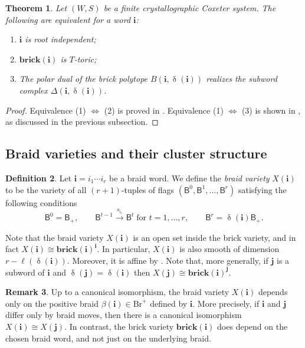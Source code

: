 \documentclass[a4paper, 11pt]{amsart}
\newcommand{\brick}{\mathbf{brick}}
\newcommand{\Br}{\mathrm{Br}}
\newcommand{\borel}{\mathsf{B}}
\newcommand{\flag}[1]{\mathsf{B}^{#1}}
\newcommand{\rel}[1]{\xrightarrow{#1}}
\newcommand{\word}[1]{\mathbf{#1}}
\DeclareMathOperator{\dem}{\delta}
\newtheorem{theorem}{Theorem}[section]
\theoremstyle{definition}
\newtheorem{remark}[theorem]{Remark}
\newtheorem{definition}[theorem]{Definition}
\begin{document}
\begin{theorem}
Let $(W, S)$ be a finite crystallographic Coxeter system. The following are equivalent for a word $\word{i}$:

\begin{enumerate}
\item $\word{i}$ is root independent;
\item $\brick(\word{i})$ is $T$-toric;
\item The polar dual of the brick polytope $B(\word{i},\dem(\word{i}))$ realizes the subword complex  $\Delta(\word{i}, \dem(\word{i}))$. 
\end{enumerate}
\end{theorem}

\begin{proof}
Equivalence (1) $\Longleftrightarrow$ (2) is proved in \cite[Theorem 23]{escobar}. Equivalence (1) $\Longleftrightarrow$ (3) is shown in \cite[Theorem 4.8, Section 7]{pilaud_stump_15}, as discussed in the previous subsection.
\end{proof}

\subsection{Braid varieties and their cluster structure}\label{sec:braid-varieties}

\begin{definition}
    Let $\word{i} = i_1\cdots i_r$ be a braid word. We define the \emph{braid variety} $X(\word{i})$ to be the variety of all $(r+1)$-tuples of flags $(\flag{0}, \flag{1}, \dots, \flag{r})$ satisfying the following conditions
    \[
    \flag{0} = \borel_+,\qquad \flag{t-1} \rel{s_{i_t}} \flag{t} \; \text{for $t = 1, \dots, r$}, \qquad \flag{r} = \dem(\word{i})\borel_+.
    \]
\end{definition}

Note that the braid variety $X(\word{i})$ is an open set inside the brick variety, and in fact $X(\word{i}) \cong \brick(\word{i})^{\word{i}}$. In particular, $X(\word{i})$ is also smooth of dimension $r - \ell(\dem(\word{i}))$. Moreover, it is affine by \cite[Corollary 3.7]{CGGLSS}. Note that, more generally, if $\word{j}$ is a subword of $\word{i}$ and $\dem(\word{j}) = \dem(\word{i})$ then $X(\word{j}) \cong \brick(\word{i})^{\word{j}}$. 

\begin{remark}
Up to a canonical isomorphism, the braid variety $X(\word{i})$ depends only on the positive braid $\beta(\word{i}) \in \Br^{+}$ defined by $\word{i}$. More precisely, if $\word{i}$ and $\word{j}$ differ only by braid moves, then there is a canonical isomorphism $X(\word{i}) \cong X(\word{j})$. In contrast, the brick variety $\brick(\word{i})$ does depend on the chosen braid word, and not just on the underlying braid. 
\end{remark}
\end{document}
